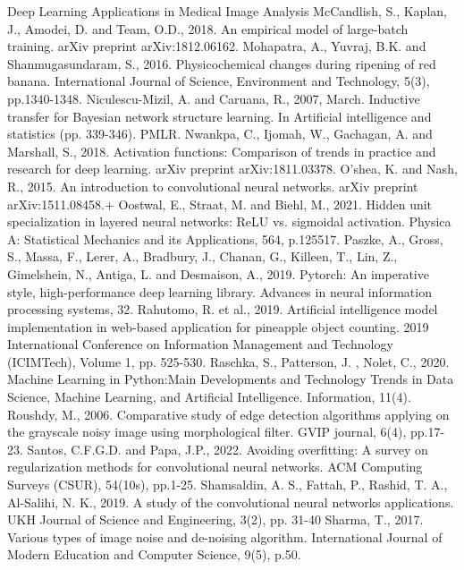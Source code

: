 \documentclass[conference]{IEEEtran}
\begin{document}
\begin{thebibliography}{00}
     Deep Learning Applications in Medical Image Analysis
     McCandlish, S., Kaplan, J., Amodei, D. and Team, O.D., 2018. An empirical model of large-batch training. arXiv preprint arXiv:1812.06162.
     Mohapatra, A., Yuvraj, B.K. and Shanmugasundaram, S., 2016. Physicochemical changes during ripening of red banana. International Journal of Science, Environment and Technology, 5(3), pp.1340-1348.
     Niculescu-Mizil, A. and Caruana, R., 2007, March. Inductive transfer for Bayesian network structure learning. In Artificial intelligence and statistics (pp. 339-346). PMLR.
     Nwankpa, C., Ijomah, W., Gachagan, A. and Marshall, S., 2018. Activation functions: Comparison of trends in practice and research for deep learning. arXiv preprint arXiv:1811.03378.
     O'shea, K. and Nash, R., 2015. An introduction to convolutional neural networks. arXiv preprint arXiv:1511.08458.+
     Oostwal, E., Straat, M. and Biehl, M., 2021. Hidden unit specialization in layered neural networks: ReLU vs. sigmoidal activation. Physica A: Statistical Mechanics and its Applications, 564, p.125517.
     Paszke, A., Gross, S., Massa, F., Lerer, A., Bradbury, J., Chanan, G., Killeen, T., Lin, Z., Gimelshein, N., Antiga, L. and Desmaison, A., 2019. Pytorch: An imperative style, high-performance deep learning library. Advances in neural information processing systems, 32.
     Rahutomo, R. et al., 2019. Artificial intelligence model implementation in web-based application for pineapple object counting. 2019 International Conference on Information Management and Technology (ICIMTech), Volume 1, pp. 525-530.
     Raschka, S., Patterson, J. , Nolet, C., 2020. Machine Learning in Python:Main Developments and Technology Trends in Data Science, Machine
    Learning, and Artificial Intelligence. Information, 11(4).
     Roushdy, M., 2006. Comparative study of edge detection algorithms applying on the grayscale noisy image using morphological filter. GVIP journal, 6(4), pp.17-23.
     Santos, C.F.G.D. and Papa, J.P., 2022. Avoiding overfitting: A survey on regularization methods for convolutional neural networks. ACM Computing Surveys (CSUR), 54(10s), pp.1-25.
     Shamsaldin, A. S., Fattah, P., Rashid, T. A., Al-Salihi, N. K., 2019. A study of the convolutional neural networks applications. UKH Journal of Science and Engineering, 3(2), pp. 31-40
     Sharma, T., 2017. Various types of image noise and de-noising algorithm. International Journal of Modern Education and Computer Science, 9(5), p.50.

\end{thebibliography}
\end{document}
